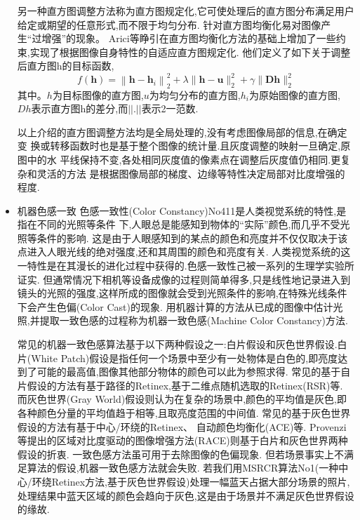 \documentclass{amsart}
\begin{document}
\begin{itemize}
  另一种直方图调整方法称为直方图规定化,它可使处理后的直方图分布满足用户给定或期望的任意形式,而不限于均匀分布.
  针对直方图均衡化易对图像产生“过增强”的现象。
  Arici等睁引在直方图均衡化方法的基础上增加了一些约束,实现了根据图像自身特性的自适应直方图规定化.
  他们定义了如下关于调整后直方图h的目标函数,
  \begin{equation}
    \label{eq:13}
    f(\boldsymbol{h})=\left\|\boldsymbol{h}-\boldsymbol{h}_{i}\right\|_{2}^{2}+\lambda\|\boldsymbol{h}-\boldsymbol{u}\|_{2}^{2}+\gamma\|\boldsymbol{D} \boldsymbol{h}\|_{2}^{2}
  \end{equation}
  其中。$h$为目标图像的直方图,$u$为均匀分布的直方图,$h_i$为原始图像的直方图,
  $Dh$表示直方图h的差分,而$||.||$表示2一范数.


以上介绍的直方图调整方法均是全局处理的,没有考虑图像局部的信息,在确定变
换或转移函数时也是基于整个图像的统计量.且灰度调整的映射一旦确定,原图中的水
平线保持不变,各处相同灰度值的像素点在调整后灰度值仍相同.更复杂和灵活的方法
是根据图像局部的梯度、边缘等特性决定局部对比度增强的程度.


\item 机器色感一致
色感一致性(Color Constancy)No411是人类视觉系统的特性,是指在不同的光照等条件
下,人眼总是能感知到物体的“实际”颜色,而几乎不受光照等条件的影响.
这是由于人眼感知到的某点的颜色和亮度并不仅仅取决于该点进入人眼光线的绝对强度,还和其周围的颜色和亮度有关.
人类视觉系统的这一特性是在其漫长的进化过程中获得的.色感一致性己被一系列的生理学实验所证实.
但通常情况下相机等设备成像的过程则简单得多,只是线性地记录进入到镜头的光照的强度,这样所成的图像就会受到光照条件的影响,在特殊光线条件下会产生色偏(Color Cast)的现象.
用机器计算的方法从已成的图像中估计光照,并提取一致色感的过程称为机器一致色感(Machine Color Constancy)方法.

常见的机器一致色感算法基于以下两种假设之一:白片假设和灰色世界假设.白片(White Patch)假设是指任何一个场景中至少有一处物体是白色的,即亮度达到了可能的最高值,图像其他部分物体的颜色可以此为参照求得.
常见的基于自片假设的方法有基于路径的Retinex,基于二维点随机选取的Retinex(RSR)等.
而灰色世界(Gray World)假设则认为在复杂的场景中,颜色的平均值是灰色,即各种颜色分量的平均值趋于相等,且取亮度范围的中间值.
常见的基于灰色世界假设的方法有基于中心/环绕的Retinex、
自动颜色均衡化(ACE)等.
Provenzi等提出的区域对比度驱动的图像增强方法(RACE)则基于白片和灰色世界两种假设的折衷.
一致色感方法虽可用于去除图像的色偏现象.
但若场景事实上不满足算法的假设,机器一致色感方法就会失败.
若我们用MSRCR算法No1(一种中心/环绕Retinex方法,基于灰色世界假设)处理一幅蓝天占据大部分场景的照片,处理结果中蓝天区域的颜色会趋向于灰色,这是由于场景并不满足灰色世界假设的缘故.
\end{itemize}
\end{document}
